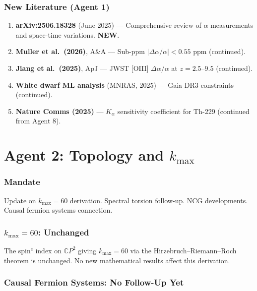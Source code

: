 \documentclass[11pt,a4paper]{article}
\newcommand{\NEW}{\textcolor{dfdblue}{\textbf{NEW}}}
\newcommand{\CP}{\mathbb{C}P}
\begin{document}
\section{New Literature (Agent 1)}

\begin{enumerate}
\item \textbf{arXiv:2506.18328} (June 2025) --- Comprehensive review of $\alpha$ measurements and space-time variations. \NEW.
\item \textbf{Muller et al.\ (2026)}, A\&A --- Sub-ppm $|\Delta\alpha/\alpha| < 0.55$ ppm (continued).
\item \textbf{Jiang et al.\ (2025)}, ApJ --- JWST [OIII] $\Delta\alpha/\alpha$ at $z = 2.5$--$9.5$ (continued).
\item \textbf{White dwarf ML analysis} (MNRAS, 2025) --- Gaia DR3 constraints (continued).
\item \textbf{Nature Comms (2025)} --- $K_\alpha$ sensitivity coefficient for Th-229 (continued from Agent 8).
\end{enumerate}


\part{Agent 2: Topology and $k_{\max}$}
\label{part:agent2}

\section{Mandate}

Update on $k_{\max} = 60$ derivation. Spectral torsion follow-up. NCG developments. Causal fermion systems connection.

\section{$k_{\max} = 60$: Unchanged}

The spin$^c$ index on $\CP^2$ giving $k_{\max} = 60$ via the Hirzebruch--Riemann--Roch theorem is unchanged. No new mathematical results affect this derivation.

\section{Causal Fermion Systems: No Follow-Up Yet}
\end{document}
